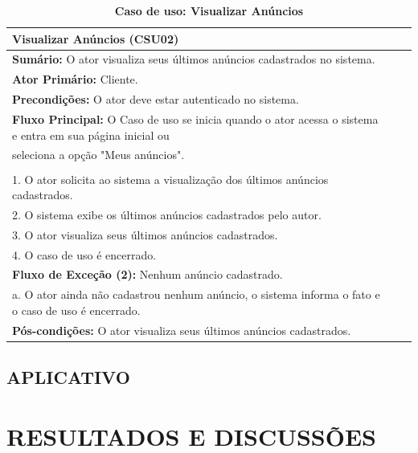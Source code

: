 \documentclass[
	12pt,				%
	openright,			%
	oneside,			%
	a4paper,			%
	chapter=TITLE,		%
	section=TITLE,		%
	english,			%
	french,				%
	spanish,			%
	brazil				%
	]{abntex2}
\begin{document}
\begin{table}[h!]
	\center\scriptsize
	\caption{\textbf{Caso de uso: Visualizar Anúncios}}
	\begin{tabular}{|l|c|c|} \hline \label{tab-csu-visualizarAnuncios}
		\textbf{Visualizar Anúncios (CSU02)} \\ \hline
		
		\textbf{Sumário:} O ator visualiza seus últimos anúncios cadastrados no sistema. \\
		\textbf{Ator Primário:} Cliente. \\
		\textbf{Precondições:} O ator deve estar autenticado no sistema. \\ \hline
		
		\textbf{Fluxo Principal:} O Caso de uso se inicia quando o ator acessa o sistema e entra em sua página inicial ou \\ seleciona a opção "Meus anúncios". \\ \\
		
		1.	O ator solicita ao sistema a visualização dos últimos anúncios cadastrados. \\
		2.	O sistema exibe os últimos anúncios cadastrados pelo autor. \\
		3.	O ator visualiza seus últimos anúncios cadastrados. \\
		4.	O caso de uso é encerrado. \\ \hline
		
		\textbf{Fluxo de Exceção (2):} Nenhum anúncio cadastrado.\\ 
		a. O ator ainda não cadastrou nenhum anúncio, o sistema informa o fato e o caso de uso é encerrado.\\ \hline
		
		\textbf{Pós-condições:} O ator visualiza seus últimos anúncios cadastrados. \\ \hline
		
	\end{tabular}
\end{table}

\section{APLICATIVO}


\chapter{RESULTADOS E DISCUSSÕES}
\end{document}
